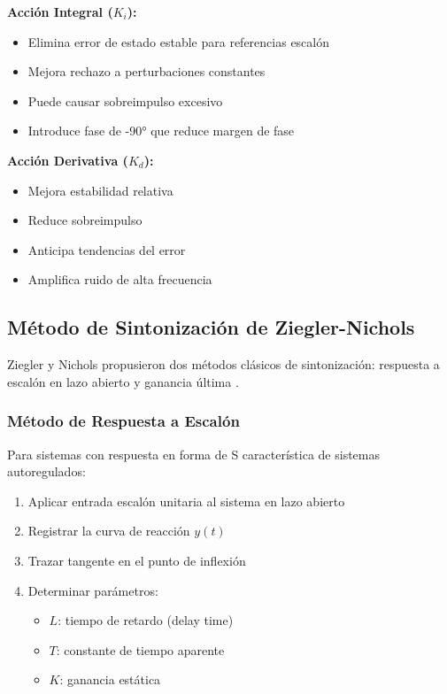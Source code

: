\documentclass[conference]{IEEEtran}
\begin{document}
\textbf{Acción Integral ($K_i$):}
\begin{itemize}
\item Elimina error de estado estable para referencias escalón
\item Mejora rechazo a perturbaciones constantes
\item Puede causar sobreimpulso excesivo
\item Introduce fase de -90° que reduce margen de fase
\end{itemize}

\textbf{Acción Derivativa ($K_d$):}
\begin{itemize}
\item Mejora estabilidad relativa
\item Reduce sobreimpulso
\item Anticipa tendencias del error
\item Amplifica ruido de alta frecuencia
\end{itemize}

\subsection{Método de Sintonización de Ziegler-Nichols}

Ziegler y Nichols propusieron dos métodos clásicos de sintonización: respuesta a escalón en lazo abierto y ganancia última \cite{ziegler}.

\subsubsection{Método de Respuesta a Escalón}

Para sistemas con respuesta en forma de S característica de sistemas autoregulados:

\begin{enumerate}
\item Aplicar entrada escalón unitaria al sistema en lazo abierto
\item Registrar la curva de reacción $y(t)$
\item Trazar tangente en el punto de inflexión
\item Determinar parámetros:
\begin{itemize}
\item $L$: tiempo de retardo (delay time)
\item $T$: constante de tiempo aparente
\item $K$: ganancia estática
\end{itemize}
\end{enumerate}
\end{document}

